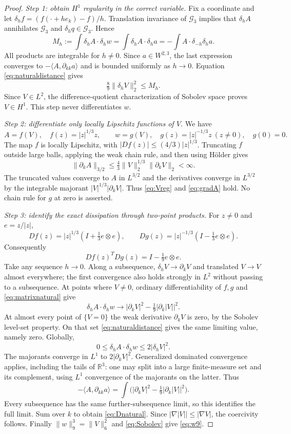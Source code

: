 \documentclass[11pt,a4paper]{article}
\theoremstyle{definition}\newtheorem{definition}[theorem]{Definition}
\theoremstyle{remark}\newtheorem{remark}[theorem]{Remark}
\newcommand{\R}{\mathbb R}
\newcommand{\G}{\mathcal G_3}
\newcommand{\norm}[1]{\lVert #1\rVert}
\newcommand{\ip}[2]{\langle #1,#2\rangle}
\numberwithin{equation}{section}
\begin{document}
\begin{proof}
\emph{Step 1: obtain $H^1$ regularity in the correct variable.}
Fix a coordinate and let $\delta_hf=(f(\cdot+he_k)-f)/h$. Translation invariance of $\G$ implies that $\delta_hA$ annihilates $\G$ and $\delta_hq\in\G$. Hence
\begin{equation}\label{eq:finiteM}
 M_h:=\int\delta_hA\cdot\delta_hw
 =\int\delta_hA\cdot\delta_ha
 =-\int A\cdot\delta_{-h}\delta_ha.
\end{equation}
All products are integrable for $h\ne0$. Since $a\in W^{2,3}$, the last expression converges to $-\ip A{\partial_{kk}a}$ and is bounded uniformly as $h\to0$. Equation \eqref{eq:naturaldistance} gives
\[
 \tfrac89\norm{\delta_hV}_2^2\le M_h.
\]
Since $V\in L^2$, the difference-quotient characterization of Sobolev space proves $V\in H^1$. This step never differentiates $w$.

\emph{Step 2: differentiate only locally Lipschitz functions of $V$.}
We have
\[
 A=f(V),\quad f(z)=|z|^{1/3}z,
 \qquad w=g(V),\quad g(z)=|z|^{-1/3}z\ (z\ne0),\quad g(0)=0.
\]
The map $f$ is locally Lipschitz, with $|Df(z)|\le(4/3)|z|^{1/3}$. Truncating $f$ outside large balls, applying the weak chain rule, and then using H\"older gives
\[
 \norm{\partial_k A}_{3/2}
 \le\tfrac43\norm V_2^{1/3}\norm{\partial_kV}_2<\infty.
\]
The truncated values converge to $A$ in $L^{3/2}$ and the derivatives converge in $L^{3/2}$ by the integrable majorant $|V|^{1/3}|\partial_kV|$. Thus \eqref{eq:Vreg} and \eqref{eq:gradA} hold. No chain rule for $g$ at zero is asserted.

\emph{Step 3: identify the exact dissipation through two-point products.}
For $z\ne0$ and $e=z/|z|$,
\[
 Df(z)=|z|^{1/3}(I+\tfrac13e\otimes e),\qquad
 Dg(z)=|z|^{-1/3}(I-\tfrac13e\otimes e).
\]
Consequently
\begin{equation}\label{eq:matrixnatural}
 Df(z)^T Dg(z)=I-\tfrac19e\otimes e.
\end{equation}
Take any sequence $h\to0$. Along a subsequence, $\delta_hV\to\partial_kV$ and translated $V\to V$ almost everywhere; the first convergence also holds strongly in $L^2$ without passing to a subsequence. At points where $V\ne0$, ordinary differentiability of $f,g$ and \eqref{eq:matrixnatural} give
\[
 \delta_hA\cdot\delta_hw\longrightarrow
 |\partial_kV|^2-\tfrac19|\partial_k|V||^2.
\]
At almost every point of $\{V=0\}$ the weak derivative $\partial_kV$ is zero, by the Sobolev level-set property. On that set \eqref{eq:naturaldistance} gives the same limiting value, namely zero. Globally,
\[
 0\le\delta_hA\cdot\delta_hw\le2|\delta_hV|^2.
\]
The majorants converge in $L^1$ to $2|\partial_kV|^2$. Generalized dominated convergence applies, including the tails of $\R^3$: one may split into a large finite-measure set and its complement, using $L^1$ convergence of the majorants on the latter. Thus
\[
 -\ip A{\partial_{kk}a}
 =\int\bigl(|\partial_kV|^2-\tfrac19|\partial_k|V||^2\bigr).
\]
Every subsequence has the same further-subsequence limit, so this identifies the full limit. Sum over $k$ to obtain \eqref{eq:Dnatural}. Since $|\nabla|V||\le|\nabla V|$, the coercivity follows. Finally $\norm w_9^3=\norm V_6^2$ and \eqref{eq:Sobolev} give \eqref{eq:w9}.
\end{proof}
\end{document}
